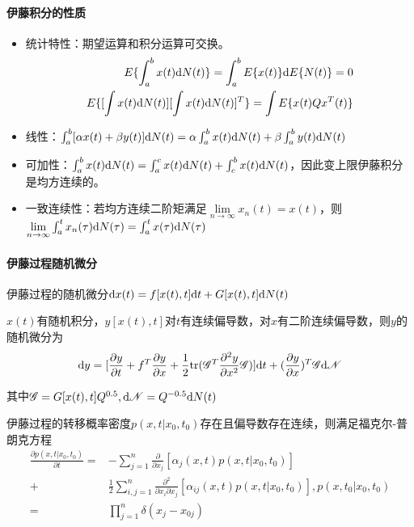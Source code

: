 \documentclass[11pt,a4paper]{ctexart}
\renewcommand{\d}{{\rm d}}
\begin{document}
        \paragraph{伊藤积分的性质}
        \begin{itemize}
            \item 统计特性：期望运算和积分运算可交换。
            \begin{align*}
            E\{\int_a^b x(t)\d N(t)\}=\int_a^b E\{x(t)\}\d E\{N(t)\}=0\\
            E\{[\int x(t)\d N(t)][\int x(t)\d N(t)]^T\}=\int E\{x(t) Qx^T(t)\}
            \end{align*}
            \item 线性：$\int_a^b [\alpha x(t)+\beta y(t)]\d N(t)=\alpha\int_a^b x(t)\d N(t)+\beta\int_a^b y(t)\d N(t)$
            \item 可加性：$\int_a^b x(t)\d N(t)=\int_a^c x(t)\d N(t)+\int_c^b x(t)\d N(t)$，因此变上限伊藤积分是均方连续的。
            \item 一致连续性：若均方连续二阶矩满足$\lim\limits_{n\rightarrow\infty}x_n(t)=x(t)$，则$\lim\limits_{n\rightarrow\infty}\int_a^tx_n(\tau)\d N(\tau)=\int_a^t x(\tau)\d N(\tau)$
        \end{itemize}

        \paragraph{伊藤过程随机微分}\leavevmode

        伊藤过程的随机微分$\d x(t)=f[x(t),t]\d t+G[x(t),t]\d N(t)$

        $x(t)$有随机积分，$y[x(t),t]$对$t$有连续偏导数，对$x$有二阶连续偏导数，则$y$的随机微分为
        \[
        \d y=[\frac{\partial y}{\partial t}+f^T\frac{\partial y}{\partial x}+\frac12{\rm tr}(\mathscr{G}^T\frac{\partial^2y}{\partial x^2}\mathscr{G})]\d t+(\frac{\partial y}{\partial x})^T\mathscr{G}\d\mathscr{N}
        \]

        其中$\mathscr{G}=G[x(t),t]Q^{0.5},\d\mathscr{N}=Q^{-0.5}\d N(t)$

        伊藤过程的转移概率密度$p(x,t|x_0,t_0)$存在且偏导数存在连续，则满足福克尔-普朗克方程
        \begin{align*}
        \frac{\partial p(x,t|x_0,t_0)}{\partial t}=&-\sum_{j=1}^n\frac{\partial}{\partial x_j}[\alpha_j(x,t)p(x,t|x_0,t_0)]\\+&\frac12\sum_{i,j=1}^n\frac{\partial^2}{\partial x_i\partial x_j}[\alpha_{ij}(x,t)p(x,t|x_0,t_0)],p(x,t_0|x_0,t_0)\\=&\prod_{j=1}^n\delta(x_j-x_{0j})
        \end{align*}
\end{document}
